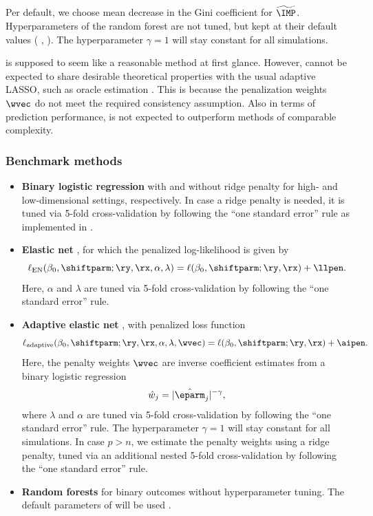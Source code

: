 \begin{subappendices}
Per default, we choose mean decrease in the Gini coefficient for
$\widetilde\IMP$. Hyperparameters of the random forest are not tuned, but kept
at their default values (\eg{} , ). The hyperparameter
$\gamma = 1$ will stay constant for all simulations.

\ainet{} is supposed to seem like a reasonable method at first glance. However,
\ainet{} cannot be expected to share desirable theoretical properties with the
usual adaptive LASSO, such as oracle estimation \citep{Zou2006}. This is because
the penalization weights $\wvec$ do not meet the required consistency
assumption. Also in terms of prediction performance, \ainet{} is not expected to
outperform methods of comparable complexity.

\subsubsection{Benchmark methods}

\begin{itemize}
  \item \textbf{Binary logistic regression} \citep{Mccullagh2019} with and
        without ridge penalty for high- and low-dimensional settings,
        respectively. In case a ridge penalty is needed, it is tuned via 5-fold
        cross-validation by following the ``one standard error'' rule as
        implemented in  \citep{Friedman2010}.
  \item \textbf{Elastic net} \citep{Zou2005}, for which the penalized
        log-likelihood is given by
    $$\ell_{\text{EN}}(\beta_0, \shiftparm; \ry, \rx, \alpha, \lambda) =
        \ell(\beta_0, \shiftparm; \ry, \rx) + \llpen.$$ Here, $\alpha$ and
        $\lambda$ are tuned via 5-fold cross-validation by following the ``one
        standard error'' rule.
   \item \textbf{Adaptive elastic net} \citep{Zou2006}, with penalized loss function
    $$\ell_{\text{adaptive}}(\beta_0, \shiftparm; \ry, \rx, \alpha, \lambda, \wvec)
        = \ell(\beta_0, \shiftparm; \ry, \rx) + \aipen.$$ Here, the penalty
        weights $\wvec$ are inverse coefficient estimates from a binary logistic
        regression
    $$\hat{w}_j = \lvert\hat\eparm_j\rvert^{-\gamma},$$
        where $\lambda$ and $\alpha$ are tuned via 5-fold cross-validation by
        following the ``one standard error'' rule. The hyperparameter
        $\gamma = 1$ will stay constant for all simulations. In case $p > n$, we
        estimate the penalty weights using a ridge penalty, tuned via an
        additional nested 5-fold cross-validation by following the ``one
        standard error'' rule.
  \item \textbf{Random forests} \citep{Breiman2001} for binary outcomes without
        hyperparameter tuning. The default parameters of  will be
        used \citep{Wright2017}.
\end{itemize}



\end{subappendices}
